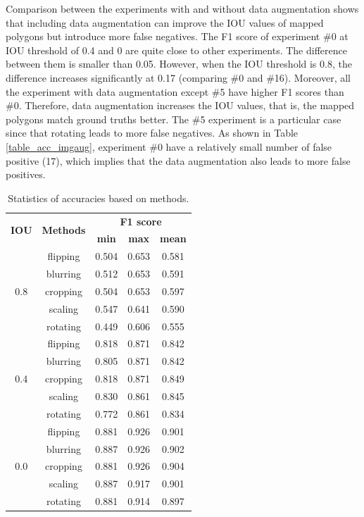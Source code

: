 \documentclass[preprint,12pt,authoryear]{elsarticle}
\begin{document}
Comparison between the experiments with and without data augmentation shows that including data augmentation can improve the IOU values of mapped polygons but introduce more false negatives. The F1 score of experiment \#0 at IOU threshold of 0.4 and 0 are quite close to other experiments. The difference between them is smaller than 0.05. However, when the IOU threshold is 0.8, the difference increases significantly at 0.17 (comparing \#0 and \#16). Moreover, all the experiment with data augmentation except \#5 have higher F1 scores than \#0. Therefore, data augmentation increases the IOU values, that is, the mapped polygons match ground truths better. The \#5 experiment is a particular case since that rotating leads to more false negatives. As shown in Table \ref{table_acc_imgaug}, experiment \#0 have a relatively small number of false positive (17), which implies that the data augmentation also leads to more false positives. 

\begin{table}[ht]
\centering
\footnotesize
\caption{Statistics of accuracies based on methods.}
\label{table_stastic_imgaug}
\begin{tabular}{c c c c  c  }
\toprule
\multirow{2}{*}{\textbf{IOU}}&\multirow{2}{*}{\textbf{Methods}}& \multicolumn{3}{c}{ \textbf{F1 score}} \\
 & &\textbf{min}&\textbf{max}&\textbf{mean}\\
\midrule
\multirow{5}{*}{0.8} &   flipping & 0.504 & 0.653 & 0.581 \\
  & blurring & 0.512 & 0.653 & 0.591\\
 & cropping & 0.504 & 0.653 & 0.597\\
 & scaling & 0.547 & 0.641 & 0.590\\
& rotating & 0.449 & 0.606 & 0.555 \\

\midrule
\multirow{5}{*}{0.4} &  flipping & 0.818 & 0.871 & 0.842 \\
 &  blurring & 0.805 & 0.871 & 0.842\\
 & cropping & 0.818 & 0.871 & 0.849\\
 & scaling & 0.830 & 0.861 & 0.845\\
& rotating & 0.772 & 0.861 & 0.834\\

\midrule
\multirow{5}{*}{0.0} & flipping & 0.881 & 0.926 & 0.901 \\
  &blurring & 0.887 & 0.926 & 0.902\\
  &cropping & 0.881 & 0.926 & 0.904\\
 &scaling & 0.887 & 0.917 & 0.901\\
&rotating & 0.881 & 0.914 & 0.897\\

\bottomrule
\end{tabular}
\end{table}
\end{document}
